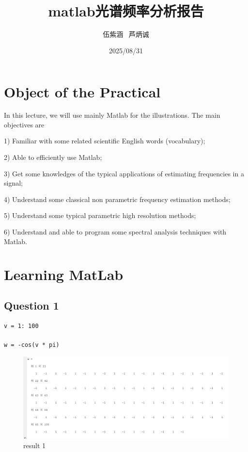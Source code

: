 \documentclass{article}
\title{matlab光谱频率分析报告}
\author{伍紫涵 \ 芦炳诚}
\date{2025/08/31}
\begin{document}
\maketitle

\tableofcontents
\newpage
{}
\section{Object of the Practical}
In this lecture, we will use mainly Matlab for the illustrations. The main objectives are

1) Familiar with some related scientific English words (vocabulary);

2) Able to efficiently use Matlab;

3) Get some knowledges of the typical applications of estimating frequencies in a signal;

4) Understand some classical non parametric frequency estimation methods;

5) Understand some typical parametric high resolution methods;

6) Understand and able to program some spectral analysis techniques with Matlab.
\section{Learning MatLab}
\subsection{Question 1}

\begin{lstlisting}
v = 1: 100

w = -cos(v * pi)
\end{lstlisting}
\begin{figure}[H]
    \centering
    \includegraphics[width=1\linewidth]{0c2363eb7126e75d7f1f5923d619db77.png}
    \caption{result 1}
    \label{fig:1}
\end{figure}
\end{document}
